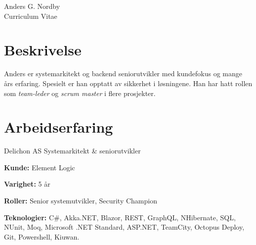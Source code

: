 \documentclass[10pt]{article} %
\begin{document}
\begin{paracol}{2} %


\parbox[top][0.12\textheight][c]{\linewidth}{ %
	\vspace{-0.04\textheight} %
	\centering %
	{\sffamily\Huge Anders G. Nordby}\\\medskip %
	{\Huge\color{headings}\cvtextfont Curriculum Vitae}
}


\section{Beskrivelse}

Anders er systemarkitekt og backend seniorutvikler med kundefokus og mange års erfaring.
Spesielt er han opptatt av sikkerhet i løsningene.
Han har hatt rollen som \textit{team-leder} og \textit{scrum master} i flere prosjekter. 


\section{Arbeidserfaring} 

{}
{Delichon AS} 
{Systemarkitekt \& seniorutvikler} 
{\textbf{}
 
\textbf{Kunde:} Element Logic

\textbf{Varighet:} 5 år

\textbf{Roller:} Senior systemutvikler, Security Champion

\textbf{Teknologier:} C\#, Akka.NET, Blazor, REST, GraphQL, NHibernate, SQL, NUnit, Moq, Microsoft .NET Standard, ASP.NET, TeamCity, Octopus Deploy, Git, Powershell, Kiuwan.
 
}
\end{paracol}
\end{document}
